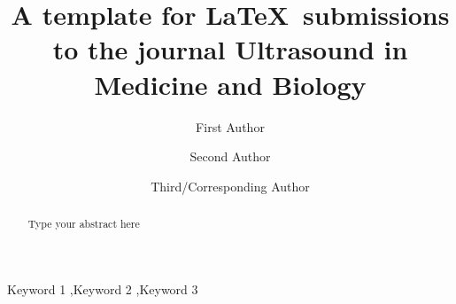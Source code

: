 \documentclass[preprint,5p]{elsarticle}
\begin{document}
\begin{frontmatter}



\title{A template for \LaTeX ~submissions to the journal Ultrasound in Medicine and Biology}






\author[Affil1]{First Author}
\author[Affil2]{Second Author}
\author[Affil1]{Third/Corresponding Author }
\address[Affil1]{Affiliation address 1}
\address[Affil2]{Affiliation address 2}


\begin{abstract}
Type your abstract here  
\end{abstract}


\begin{keyword}
Keyword 1 \sep Keyword 2 \sep Keyword 3
\end{keyword}

\end{frontmatter}
\end{document}
